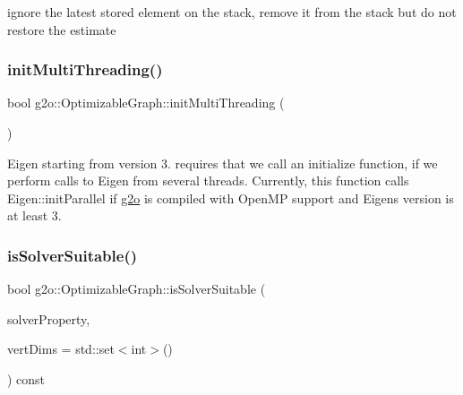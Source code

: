 ignore the latest stored element on the stack, remove it from the stack but do not restore the estimate 

\mbox{\label{structg2o_1_1_optimizable_graph_ab4ee0fc3ecd31852276ded40b62e9c76}} 
\subsubsection{\texorpdfstring{init\+Multi\+Threading()}{initMultiThreading()}}
{\footnotesize\ttfamily bool g2o\+::\+Optimizable\+Graph\+::init\+Multi\+Threading (\begin{DoxyParamCaption}{ }\end{DoxyParamCaption})\hspace{0.3cm}{\ttfamily [static]}}

Eigen starting from version 3. requires that we call an initialize function, if we perform calls to Eigen from several threads. Currently, this function calls Eigen\+::init\+Parallel if \mbox{\hyperlink{namespaceg2o}{g2o}} is compiled with Open\+MP support and Eigen\textquotesingle{}s version is at least 3. \mbox{\label{structg2o_1_1_optimizable_graph_a5b957f752c6afe7bc76baf00129f854e}} 
\subsubsection{\texorpdfstring{is\+Solver\+Suitable()}{isSolverSuitable()}}
{\footnotesize\ttfamily bool g2o\+::\+Optimizable\+Graph\+::is\+Solver\+Suitable (\begin{DoxyParamCaption}\item[{const \mbox{\hyperlink{structg2o_1_1_optimization_algorithm_property}{Optimization\+Algorithm\+Property}} \&}]{solver\+Property,  }\item[{const std\+::set$<$ int $>$ \&}]{vert\+Dims = {\ttfamily std\+:\+:set$<$int$>$()} }\end{DoxyParamCaption}) const}

